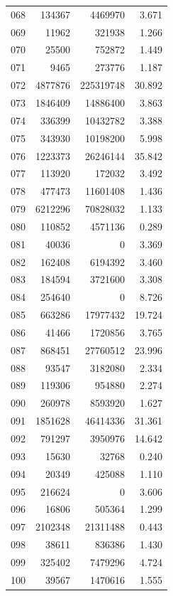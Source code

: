 \documentclass[anonymous,notoc]{gmcm2026}
\begin{document}
\begin{longtable}{lrrr}
068 & 134367 & 4469970 & 3.671 \\
069 & 11962 & 321938 & 1.266 \\
070 & 25500 & 752872 & 1.449 \\
071 & 9465 & 273776 & 1.187 \\
072 & 4877876 & 225319748 & 30.892 \\
073 & 1846409 & 14886400 & 3.863 \\
074 & 336399 & 10432782 & 3.388 \\
075 & 343930 & 10198200 & 5.998 \\
076 & 1223373 & 26246144 & 35.842 \\
077 & 113920 & 172032 & 3.492 \\
078 & 477473 & 11601408 & 1.436 \\
079 & 6212296 & 70828032 & 1.133 \\
080 & 110852 & 4571136 & 0.289 \\
081 & 40036 & 0 & 3.369 \\
082 & 162408 & 6194392 & 3.460 \\
083 & 184594 & 3721600 & 3.308 \\
084 & 254640 & 0 & 8.726 \\
085 & 663286 & 17977432 & 19.724 \\
086 & 41466 & 1720856 & 3.765 \\
087 & 868451 & 27760512 & 23.996 \\
088 & 93547 & 3182080 & 2.334 \\
089 & 119306 & 954880 & 2.274 \\
090 & 260978 & 8593920 & 1.627 \\
091 & 1851628 & 46414336 & 31.361 \\
092 & 791297 & 3950976 & 14.642 \\
093 & 15630 & 32768 & 0.240 \\
094 & 20349 & 425088 & 1.110 \\
095 & 216624 & 0 & 3.606 \\
096 & 16806 & 505364 & 1.299 \\
097 & 2102348 & 21311488 & 0.443 \\
098 & 38611 & 836386 & 1.430 \\
099 & 325402 & 7479296 & 4.724 \\
100 & 39567 & 1470616 & 1.555 \\
\end{longtable}
\end{document}
